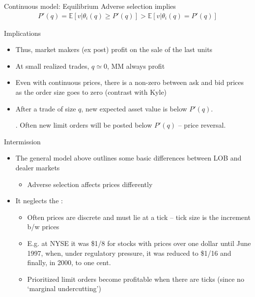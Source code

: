 \documentclass[english,10pt
,aspectratio=169
]{beamer}
\begin{document}
\begin{frame}{Continuous model: Equilibrium}
	Adverse selection implies
	\begin{align}
	P'(q) = \mathbb{E}[v|\theta_i(q) \geq P'(q)] > \mathbb{E}[v|\theta_i(q) = P'(q)]
	\end{align}
	\pause
	\begin{block}{Implications}
		\begin{itemize}
			\item Thus, market makers (ex post) profit on the sale of the last units
			\item At small realized trades, $q \simeq 0$, MM always profit
			\item Even with continuous prices, there is a non-zero  between ask and bid prices as the order size goes to zero (contrast with Kyle)
			\item After a trade of size $q$, new expected asset value is below $P'(q)$. \pause 
			
			. Often new limit orders will be posted below $P'(q)$ -- price reversal.
		\end{itemize}
	\end{block}
\end{frame}


\begin{frame}{Intermission}
	\begin{itemize}
		\item The general model above outlines some basic differences between LOB and dealer markets
		\begin{itemize}
			\item Adverse selection affects prices differently
		\end{itemize}
		\item It neglects the :
		\begin{itemize}
			\item Often prices are discrete and must lie at a tick --  tick size is the increment b/w prices
			\item E.g. at NYSE it was \$1/8 for stocks with prices over one dollar until June 1997, when, under regulatory pressure, it was reduced to \$1/16 and finally, in 2000, to one cent.
			\item Prioritized limit orders become profitable when there are ticks (since no `marginal undercutting')
		\end{itemize}
	\end{itemize}
\end{frame}
\end{document}
